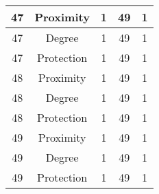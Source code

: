 \documentclass[results.tex]{subfiles}
\begin{document}
\begin{center}
\begin{tabular}{| c || c | c | c | c |}
            \hline
            47                      & Proximity                    & 1                      & 49                      & 1                    \\
            \hline
            47                      & Degree                       & 1                      & 49                      & 1                    \\
            \hline
            47                      & Protection                   & 1                      & 49                      & 1                    \\
            \hline
            48                      & Proximity                    & 1                      & 49                      & 1                    \\
            \hline
            48                      & Degree                       & 1                      & 49                      & 1                    \\
            \hline
            48                      & Protection                   & 1                      & 49                      & 1                    \\
            \hline
            49                      & Proximity                    & 1                      & 49                      & 1                    \\
            \hline
            49                      & Degree                       & 1                      & 49                      & 1                    \\
            \hline
            49                      & Protection                   & 1                      & 49                      & 1                    \\
            \hline
        \end{tabular}
    \end{center}
\end{document}

